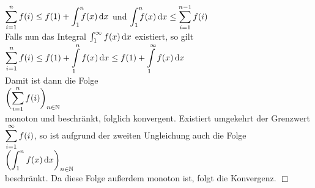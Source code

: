 \\[0.2cm]
\hspace*{1.3cm}
$\ds \sum\limits_{i=1}^n f(i) \leq f(1) + \dint{1}{n} f(x)\, \dr x$
\quad und \quad
$\dint{1}{n} f(x)\, \dr x \leq \sum\limits_{i=1}^{n-1} f(i)$
\\[0.2cm]
Falls nun das Integral $\int_{1}^\infty f(x)\, \textrm{d} x$ existiert, so gilt
\\[0.2cm]
\hspace*{1.3cm}
$\displaystyle \sum\limits_{i=1}^{n} f(i) \leq f(1) + \int\limits_{1}^n f(x)\, \textrm{d} x \leq f(1) + \int\limits_{1}^\infty f(x)\, \textrm{d} x$
\\[0.2cm]
Damit ist dann die Folge 
\\
\hspace*{1.3cm}
$\displaystyle \biggl(\sum\limits_{i=1}^{n}  f(i)\biggr)_{n\in\mathbb{N}}$ 
\\ 
monoton und beschr\"ankt, folglich konvergent.  Existiert umgekehrt der Grenzwert
$\displaystyle \sum\limits_{i=1}^{\infty} f(i)$, so  ist aufgrund der zweiten Ungleichung auch die Folge
\\[0.3cm]
\hspace*{1.3cm}
$\displaystyle \biggl(\int_{1}^n f(x)\, \textrm{d} x\biggr)_{n\in\mathbb{N}}$
\\[0.3cm]
beschr\"ankt.  Da diese Folge au{\ss}erdem monoton ist, folgt die Konvergenz. \hspace*{\fill} $\Box$
\vspace*{0.3cm}


